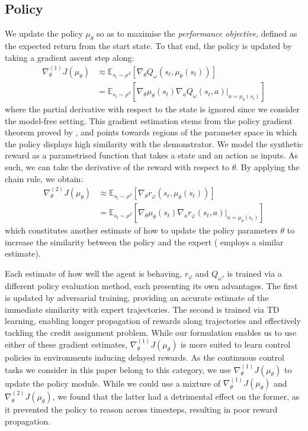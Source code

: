 \subsection{Policy}
We update the policy $\mu_\theta$ so as to maximise the
\textit{performance objective},
defined as the expected return from the start state.
To that end, the policy is updated by taking a gradient ascent step along:
\begin{align}
  \nabla_\theta^{(1)} J(\mu_\theta)
  & \approx \mathbb{E}_{s_t \sim \rho^\beta}
  \left[
  \nabla_\theta
  Q_\omega(s_t, \mu_\theta(s_t))
  \right]
  \\
  & = \mathbb{E}_{s_t \sim \rho^\beta}
  \left[
  \nabla_\theta
  \mu_\theta(s_t) \nabla_a Q_\omega(s_t, a)
  |_{a = \mu_\theta(s_t)}
  \right]
  \label{eq:thetagrad2}
\end{align}
where the partial derivative with respect to the state is
ignored since we consider the model-free setting.
This gradient estimation stems from the policy gradient theorem proved by
\cite{Silver2014-dk},
and points towards regions of the parameter space in which the policy
displays high similarity with the demonstrator.
We model the synthetic reward as a parametrised function
that takes a state and an action as inputs.
As such, we can take the derivative of the reward with respect to $\theta$.
By applying the chain rule, we obtain:
\begin{align}
  \nabla_\theta^{(2)} J(\mu_\theta)
  & \approx \mathbb{E}_{s_t \sim \rho^\beta}
  \left[
  \nabla_\theta
  r_\varphi(s_t, \mu_\theta(s_t))
  \right]
  \\
  & = \mathbb{E}_{s_t \sim \rho^\beta}
  \left[
  \nabla_\theta
  \mu_\theta(s_t) \nabla_a r_\varphi(s_t, a)
  |_{a = \mu_\theta(s_t)}
  \right]
  \label{eq:thetagrad1}
\end{align}
which constitutes another estimate of how to update
the policy parameters $\theta$ to increase the similarity between the
policy and the expert (\cite{Sasaki2019-uq} employs a similar estimate).

Each estimate of how well the agent is behaving,
$r_\varphi$ and $Q_\omega$, is trained via a
different policy evaluation method, each presenting its own advantages.
The first is updated by adversarial training, providing an accurate estimate of
the immediate similarity with expert trajectories.
The second is trained via TD learning, enabling longer propagation of
rewards along trajectories and effectively tackling the credit assignment
problem.
While our formulation enables us to use either of these gradient estimates,
$\nabla_\theta^{(1)} J(\mu_\theta)$ is more suited to learn control policies in
environments inducing delayed rewards.
As the continuous control tasks we consider in this paper belong to this
category, we use $\nabla_\theta^{(1)} J(\mu_\theta)$ to update the policy module.
While we could use a mixture of $\nabla_\theta^{(1)} J(\mu_\theta)$ and
$\nabla_\theta^{(2)} J(\mu_\theta)$, we found that the latter had a
detrimental effect on the former, as it prevented the policy to reason
across timesteps, resulting in poor reward propagation.

